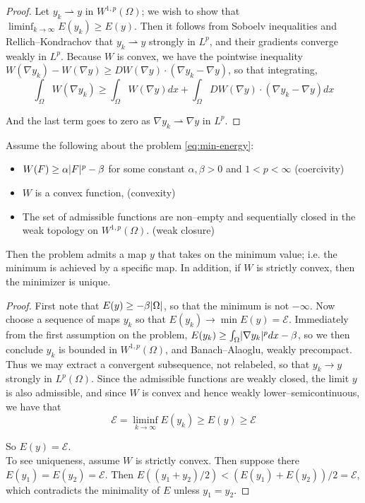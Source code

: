 \documentclass[../main.tex]{subfiles}
\begin{document}
\begin{proof}
  Let $y_k \rightharpoonup y$ in $W^{1,p}(\Omega)$; we wish to show that $\liminf_{k \to \infty} E(y_k) \geq E(y)$.
  Then it follows from Soboelv inequalities and Rellich--Kondrachov that $y_k \rightharpoonup y$ strongly in $L^p$, and their gradients converge weakly in $L^p$. 
  Because $W$ is convex, we have the pointwise inequality $W(\nabla y_k) - W(\nabla y) \geq  DW(\nabla y) \cdot (\nabla y_{k} - \nabla y)$, so that integrating,
  \begin{equation*}
    \int_{\Omega} W(\nabla y_k) \geq \int_{\Omega} W(\nabla y) dx + \int_{\Omega} DW ( \nabla y) \cdot (\nabla y_k - \nabla y) dx
  \end{equation*}

  And the last term goes to zero as $\nabla y_{k} \rightharpoonup \nabla y$ in $L^p$.
\end{proof}

\begin{thm}
  Assume the following about the problem \eqref{eq:min-energy}:
  \begin{itemize}
  \item $W(F) \geq \alpha \lvert F\rvert^p - \beta$ for some constant $\alpha, \beta > 0$ and $1 < p < \infty$ (coercivity)
  \item $W$ is a convex function, (convexity)
  \item The set of admissible functions are non--empty and sequentially closed in the weak topology on $W^{1,p}(\Omega)$. (weak closure)
  \end{itemize}

  Then the problem admits a map $y$ that takes on the minimum value; i.e. the minimum is achieved by a specific map.
  In addition, if $W$ is strictly convex, then the minimizer is unique.
\end{thm}

\begin{proof}
  First note that $E(y) \geq - \beta \lvert\Omega\rvert$, so that the minimum is not $- \infty$.
  Now choose a sequence of maps $y_k$ so that $E(y_k) \to \min E(y) = \mathcal{E}$.
  Immediately from the first assumption on the problem, $E(y_k) \geq \int_{\Omega} \lvert\nabla y_k\rvert^{p} dx - \beta$, so we then conclude $y_k$ is bounded in $W^{1,p}(\Omega)$, and Banach--Alaoglu, weakly precompact.
  Thus we may extract a convergent subsequence, not relabeled, so that $y_k \to y$ strongly in $L^p(\Omega)$.
  Since the admissible functions are weakly closed, the limit $y$ is also admissible, and since $W$ is convex and hence weakly lower--semicontinuous, we have that
  \begin{equation*}
    \mathcal{E} = \liminf_{k \to \infty} E(y_k) \geq E(y) \geq \mathcal{E}
  \end{equation*}

  So $E(y) = \mathcal{E}$. \\

  To see uniqueness, assume $W$ is strictly convex.
  Then suppose there $E(y_1) = E(y_2) = \mathcal{E}$.
  Then $E((y_1+y_2)/2) < (E(y_1) + E(y_2))/2 = \mathcal{E}$, which contradicts the minimality of $E$ unless $y_1 = y_2$.
\end{proof}
\end{document}
